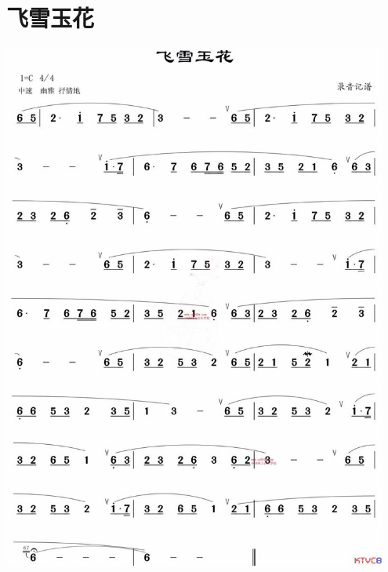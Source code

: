 \documentclass[cn,pad,twocol]{elegantbook}
\begin{document}
\section{飞雪玉花}\includegraphics[width=0.95\textwidth]{dongxiao/20200819/飞雪玉花.jpeg}
\end{document}
